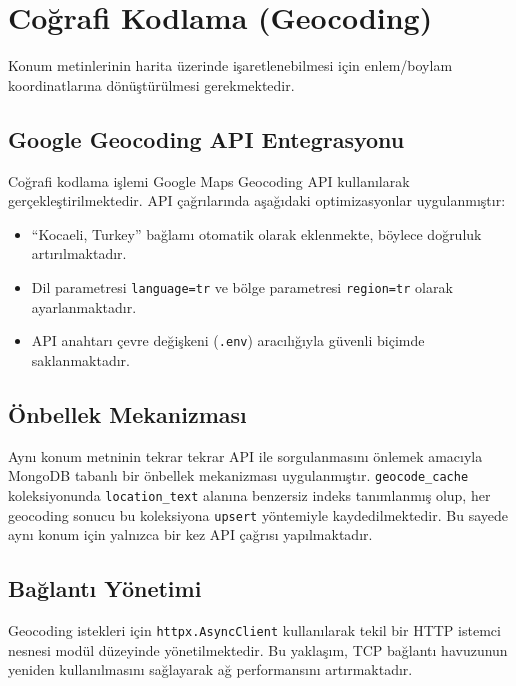 \documentclass[conference]{IEEEtran}
\begin{document}
\section{Coğrafi Kodlama (Geocoding)}
\label{sec:geocoding}

Konum metinlerinin harita üzerinde işaretlenebilmesi için enlem/boylam koordinatlarına dönüştürülmesi gerekmektedir.

\subsection{Google Geocoding API Entegrasyonu}

Coğrafi kodlama işlemi Google Maps Geocoding API kullanılarak gerçekleştirilmektedir. API çağrılarında aşağıdaki optimizasyonlar uygulanmıştır:

\begin{itemize}[leftmargin=*]
    \item ``Kocaeli, Turkey'' bağlamı otomatik olarak eklenmekte, böylece doğruluk artırılmaktadır.
    \item Dil parametresi \texttt{language=tr} ve bölge parametresi \texttt{region=tr} olarak ayarlanmaktadır.
    \item API anahtarı çevre değişkeni (\texttt{.env}) aracılığıyla güvenli biçimde saklanmaktadır.
\end{itemize}

\subsection{Önbellek Mekanizması}

Aynı konum metninin tekrar tekrar API ile sorgulanmasını önlemek amacıyla MongoDB tabanlı bir önbellek mekanizması uygulanmıştır. \texttt{geocode\_cache} koleksiyonunda \texttt{location\_text} alanına benzersiz indeks tanımlanmış olup, her geocoding sonucu bu koleksiyona \texttt{upsert} yöntemiyle kaydedilmektedir. Bu sayede aynı konum için yalnızca bir kez API çağrısı yapılmaktadır.

\subsection{Bağlantı Yönetimi}

Geocoding istekleri için \texttt{httpx.AsyncClient} kullanılarak tekil bir HTTP istemci nesnesi modül düzeyinde yönetilmektedir. Bu yaklaşım, TCP bağlantı havuzunun yeniden kullanılmasını sağlayarak ağ performansını artırmaktadır.
\end{document}
